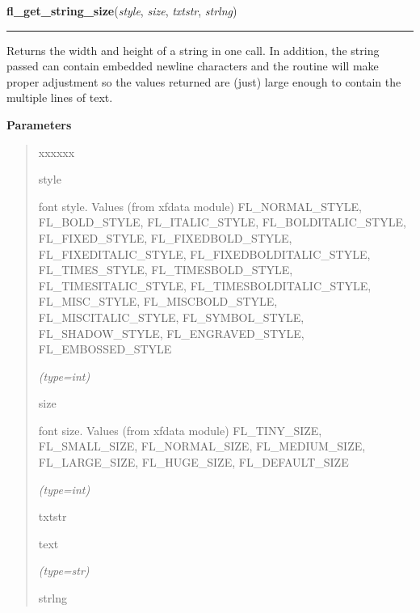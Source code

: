 \hspace{.8\funcindent}\begin{boxedminipage}{\funcwidth}

    \raggedright \textbf{fl\_get\_string\_size}(\textit{style}, \textit{size}, \textit{txtstr}, \textit{strlng})

    \vspace{-1.5ex}

    \rule{\textwidth}{0.5\fboxrule}
\setlength{\parskip}{2ex}
    Returns the width and height of a string in one call. In addition, the 
    string passed can contain embedded newline characters and the routine 
    will make proper adjustment so the values returned are (just) large 
    enough to contain the multiple lines of text.

\setlength{\parskip}{1ex}
      \textbf{Parameters}
      \vspace{-1ex}

      \begin{quote}
        \begin{Ventry}{xxxxxx}

          \item[style]

          font style. Values (from xfdata module) FL\_NORMAL\_STYLE, 
          FL\_BOLD\_STYLE, FL\_ITALIC\_STYLE, FL\_BOLDITALIC\_STYLE, 
          FL\_FIXED\_STYLE, FL\_FIXEDBOLD\_STYLE, FL\_FIXEDITALIC\_STYLE, 
          FL\_FIXEDBOLDITALIC\_STYLE, FL\_TIMES\_STYLE, 
          FL\_TIMESBOLD\_STYLE, FL\_TIMESITALIC\_STYLE, 
          FL\_TIMESBOLDITALIC\_STYLE, FL\_MISC\_STYLE, FL\_MISCBOLD\_STYLE,
          FL\_MISCITALIC\_STYLE, FL\_SYMBOL\_STYLE, FL\_SHADOW\_STYLE, 
          FL\_ENGRAVED\_STYLE, FL\_EMBOSSED\_STYLE

            {\it (type=int)}

          \item[size]

          font size. Values (from xfdata module) FL\_TINY\_SIZE, 
          FL\_SMALL\_SIZE, FL\_NORMAL\_SIZE, FL\_MEDIUM\_SIZE, 
          FL\_LARGE\_SIZE, FL\_HUGE\_SIZE, FL\_DEFAULT\_SIZE

            {\it (type=int)}

          \item[txtstr]

          text

            {\it (type=str)}

          \item[strlng]


\end{Ventry}
\end{quote}
\end{boxedminipage}
